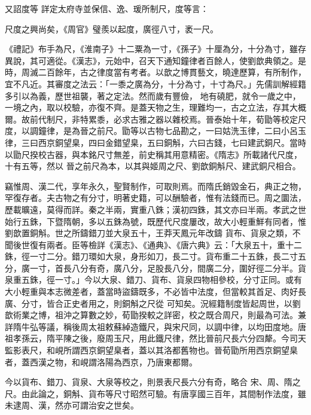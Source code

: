 \begin{pinyinscope}
 又詔度等
 詳定太府寺並保信、逸、瑗所制尺，度等言：



 尺度之興尚矣，《周官》璧羨以起度，廣徑八寸，袤一尺。



 《禮記》布手為尺，《淮南子》十二粟為一寸，《孫子》十厘為分，十分為寸，雖存異說，其可適從。《漢志》，元始中，召天下通知鐘律者百餘人，使劉歆典領之。是時，周滅二百餘年，古之律度當有考者。以歆之博貫藝文，曉達歷算，有所制作，宜不凡近。其審度之法云：「一黍之廣為分，十分為寸，十寸為尺。」先儒訓解經籍多引以為義，歷世祖襲，著之定法。然而歲有豐儉，
 地有磽肥，就令一歲之中，一境之內，取以校驗，亦復不齊。是蓋天物之生，理難均一，古之立法，存其大概爾。故前代制尺，非特累黍，必求古雅之器以雜校焉。晉泰始十年，荀勖等校定尺度，以調鐘律，是為晉之前尺。勖等以古物七品勘之，一曰姑洗玉律，二曰小呂玉律，三曰西京銅望臬，四曰金錯望臬，五曰銅斛，六曰古錢，七曰建武銅尺。當時以勖尺揆校古器，與本銘尺寸無差，前史稱其用意精密。《隋志》所載諸代尺度，十有五等，然以
 晉之前尺為本，以其與姬周之尺、劉歆銅斛尺、建武銅尺相合。



 竊惟周、漢二代，享年永久，聖賢制作，可取則焉。而隋氏銷毀金石，典正之物，罕復存者。夫古物之有分寸，明著史籍，可以酬驗者，惟有法錢而已。周之圜法，歷載曠遠，莫得而詳。秦之半兩，實重八銖；漢初四銖，其文亦曰半兩。孝武之世始行五銖，下暨隋朝，多以五銖為號，既歷代尺度屢改，故大小輕重鮮有同者，惟劉歆置銅斛。世之所鑄錯刀並大泉五十，王莽天鳳元年改鑄
 貨布、貨泉之類，不聞後世復有兩者。臣等檢詳《漢志》、《通典》、《唐六典》云：「大泉五十，重十二銖，徑一寸二分。錯刀環如大泉，身形如刀，長二寸。貨布重二十五銖，長二寸五分，廣一寸，首長八分有奇，廣八分，足股長八分，間廣二分，圍好徑二分半。貨泉重五銖，徑一寸。」今以大泉、錯刀、貨布、貨泉四物相參校，分寸正同。或有大小輕重與本志微差者，蓋當時盜鑄既多，不必皆中法度，但當較其首足、肉好長廣、分寸，皆合正史者用之，則銅斛之尺從
 可知矣。況經籍制度皆起周世，以劉歆術業之博，祖沖之算數之妙，荀勖揆較之詳密，校之既合周尺，則最為可法。兼詳隋牛弘等議，稱後周太祖敕蘇綽造鐵尺，與宋尺同，以調中律，以均田度地。唐祖孝孫云，隋平陳之後，廢周玉尺，用此鐵尺律，然比晉前尺長六分四犛。今司天監影表尺，和峴所謂西京銅望臬者，蓋以其洛都舊物也。晉荀勖所用西京銅望臬者，蓋西漢之物，和峴謂洛陽為西京，乃唐東都爾。



 今以貨布、錯刀、貨泉、大泉等校之，則景表尺長六分有奇，略合
 宋、周、隋之尺。由此論之，銅斛、貨布等尺寸昭然可驗。有唐享國三百年，其間制作法度，雖未逮周、漢，然亦可謂治安之世矣。




\end{pinyinscope}
